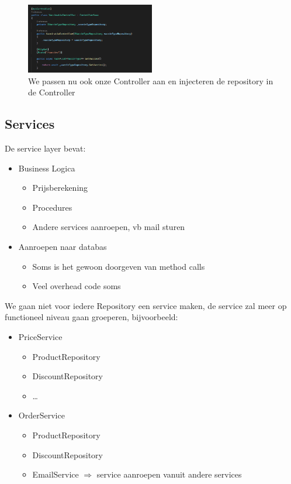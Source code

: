 \documentclass{article}
\begin{document}
\begin{figure}[H]
    \centering
    \includegraphics[width=0.5\textwidth]{dependency-injection-4.png}
    \caption{We passen nu ook onze Controller aan en injecteren de repository in de Controller}
\end{figure}

\subsection{Services}

De service layer bevat:

\begin{itemize}
    \item Business Logica
    \begin{itemize}
        \item Prijsberekening
        \item Procedures
        \item Andere services aanroepen, vb mail sturen
    \end{itemize}
    \item Aanroepen naar databas
    \begin{itemize}
        \item Soms is het gewoon doorgeven van method calls
        \item Veel overhead code soms
    \end{itemize}
\end{itemize}

We gaan niet voor iedere Repository een service maken, de service zal meer op functioneel niveau gaan groeperen, bijvoorbeeld:

\begin{itemize}
    \item PriceService
    \begin{itemize}
        \item ProductRepository
        \item DiscountRepository
        \item \dots
    \end{itemize}
    \item OrderService
    \begin{itemize}
        \item ProductRepository
        \item DiscountRepository
        \item EmailService $\Rightarrow$ service aanroepen vanuit andere services
    \end{itemize}
\end{itemize}
\end{document}
